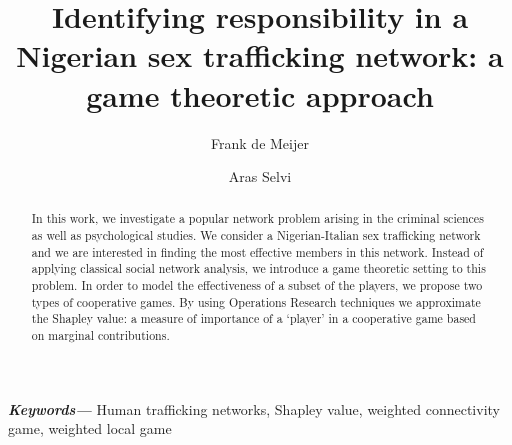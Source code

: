 \documentclass[10p]{article}
\makeatletter
\newcommand{\reqnomode}{\tagsleft@false\let\veqno\@@eqno}
\providecommand{\keywords}[1]{\textbf{\textit{Keywords---}} #1} %
\theoremstyle{definition}
\theoremstyle{definition}
\makeatother
\begin{document}
\setlength{\droptitle}{-4em}   %

\title{Identifying responsibility in a Nigerian sex trafficking network: a game theoretic approach}
\author[1]{Frank de Meijer}
\author[2]{Aras Selvi}

\date{}

\maketitle

\begin{abstract} \noindent
In this work, we investigate a popular network problem arising in the criminal sciences as well as psychological studies. We consider a Nigerian-Italian sex trafficking network and we are interested in finding the most effective members in this network. Instead of applying classical social network analysis, we introduce a game theoretic setting to this problem. In order to model the effectiveness of a subset of the players, we propose two types of cooperative games. By using Operations Research techniques we approximate the Shapley value: a measure of importance of a `player' in a cooperative game based on marginal contributions. 
\end{abstract}
\keywords{Human trafficking networks, Shapley value, weighted connectivity game, weighted local game}

\reqnomode
\end{document}
